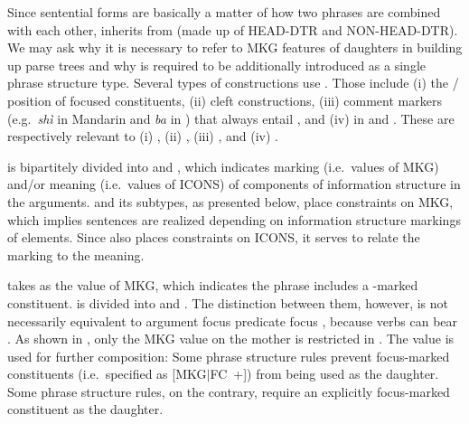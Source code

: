 Since sentential forms are basically a matter of how two phrases are
combined with each other,  inherits
from  (made up of HEAD-DTR and
NON-HEAD-DTR). We may ask why it is necessary to refer to MKG features
of daughters in building up parse trees and why  is
required to be additionally introduced as a single phrase structure
type.  Several types of constructions use .  Those include
(i) the / position of focused
constituents, (ii) cleft constructions, (iii) comment
markers (e.g.\ \textit{sh\`{i}} in Mandarin  and
\textit{ba} in ) that always entail ,
and (iv)  in  and 
\citep{choi:99,ishihara:01,song:bender:11}. These are respectively
relevant to (i) , (ii) , (iii)
, and (iv)  \vs
{}.




 is bipartitely divided into  and
, which indicates marking (i.e.\ values of MKG) and/or
meaning (i.e.\ values of ICONS) of components of information structure
in the arguments.  and
its subtypes, as presented below, place constraints on MKG,
which implies sentences are realized depending on information
structure markings of elements.  Since  also places
constraints on ICONS, it serves to relate the marking to the meaning.


 takes  as the value of MKG, which
indicates the phrase includes a -marked constituent.
 is divided into  and
. The distinction
between them, however, is not necessarily equivalent to argument focus
\vs predicate focus \citep{lambrecht:96,erteschik:07}, because verbs
can bear .  As shown in , only
the MKG value on the mother is restricted in . The value
is used for further composition: Some phrase structure rules prevent
focus-marked constituents (i.e.\ specified as \mbox{[MKG{$\mid$}FC
    +]}) from being used as the daughter. Some phrase structure rules,
on the contrary, require an explicitly focus-marked constituent as the
daughter.




